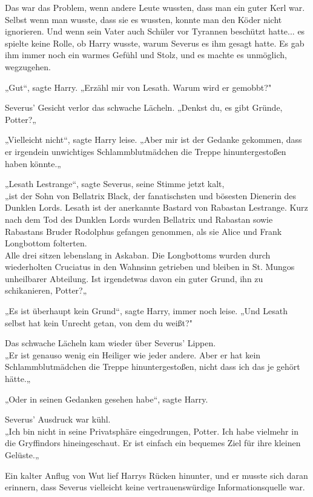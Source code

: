 {Das war das Problem, wenn andere Leute wussten, dass man ein guter Kerl war.\\ Selbst wenn man wusste, dass sie es wussten, konnte man den Köder nicht ignorieren. Und wenn sein Vater auch Schüler vor Tyrannen beschützt hatte... es spielte keine Rolle, ob Harry wusste, warum Severus es ihm gesagt hatte. Es gab ihm immer noch ein warmes Gefühl und Stolz, und es machte es unmöglich, wegzugehen.

„Gut“, sagte Harry. „Erzähl mir von Lesath. Warum wird er gemobbt?"

Severus' Gesicht verlor das schwache Lächeln. „Denkst du, es gibt Gründe, Potter?„

„Vielleicht nicht“, sagte Harry leise. „Aber mir ist der Gedanke gekommen, dass er irgendein unwichtiges Schlammblutmädchen die Treppe hinuntergestoßen haben könnte.„

„Lesath Lestrange“, sagte Severus, seine Stimme jetzt kalt,\\ „ist der Sohn von Bellatrix Black, der fanatischsten und bösesten Dienerin des Dunklen Lords. Lesath ist der anerkannte Bastard von Rabastan Lestrange. Kurz nach dem Tod des Dunklen Lords wurden Bellatrix und Rabastan sowie Rabastans Bruder Rodolphus gefangen genommen, als sie Alice und Frank Longbottom folterten.\\ Alle drei sitzen lebenslang in Askaban. Die Longbottoms wurden durch wiederholten Cruciatus in den Wahnsinn getrieben und bleiben in St. Mungos unheilbarer Abteilung. Ist irgendetwas davon ein guter Grund, ihn zu schikanieren, Potter?„

„Es ist überhaupt kein Grund“, sagte Harry, immer noch leise. „Und Lesath selbst hat kein Unrecht getan, von dem du weißt?"

Das schwache Lächeln kam wieder über Severus' Lippen.\\ „Er ist genauso wenig ein Heiliger wie jeder andere. Aber er hat kein Schlammblutmädchen die Treppe hinuntergestoßen, nicht dass ich das je gehört hätte.„

„Oder in seinen Gedanken gesehen habe“, sagte Harry.

Severus' Ausdruck war kühl.\\ „Ich bin nicht in seine Privatsphäre eingedrungen, Potter. Ich habe vielmehr in die Gryffindors hineingeschaut. Er ist einfach ein bequemes Ziel für ihre kleinen Gelüste.„

Ein kalter Anflug von Wut lief Harrys Rücken hinunter, und er musste sich daran erinnern, dass Severus vielleicht keine vertrauenswürdige Informationsquelle war.

}

